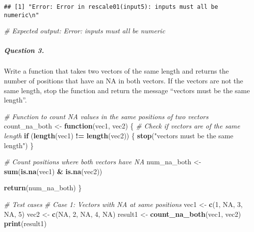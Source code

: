 \documentclass[
]{article}
\newenvironment{Shaded}{\begin{snugshade}}{\end{snugshade}}
\newcommand{\CommentTok}[1]{\textcolor[rgb]{0.56,0.35,0.01}{\textit{#1}}}
\newcommand{\ConstantTok}[1]{\textcolor[rgb]{0.56,0.35,0.01}{#1}}
\newcommand{\ControlFlowTok}[1]{\textcolor[rgb]{0.13,0.29,0.53}{\textbf{#1}}}
\newcommand{\DecValTok}[1]{\textcolor[rgb]{0.00,0.00,0.81}{#1}}
\newcommand{\FunctionTok}[1]{\textcolor[rgb]{0.13,0.29,0.53}{\textbf{#1}}}
\newcommand{\NormalTok}[1]{#1}
\newcommand{\OtherTok}[1]{\textcolor[rgb]{0.56,0.35,0.01}{#1}}
\newcommand{\SpecialCharTok}[1]{\textcolor[rgb]{0.81,0.36,0.00}{\textbf{#1}}}
\newcommand{\StringTok}[1]{\textcolor[rgb]{0.31,0.60,0.02}{#1}}
\begin{document}
\begin{verbatim}
## [1] "Error: Error in rescale01(input5): inputs must all be numeric\n"
\end{verbatim}

\begin{Shaded}
\begin{Highlighting}[]
\CommentTok{\# Expected output: Error: inputs must all be numeric}
\end{Highlighting}
\end{Shaded}

\hypertarget{question-3.}{%
\subparagraph{Question 3.}\label{question-3.}}

Write a function that takes two vectors of the same length and returns
the number of positions that have an NA in both vectors. If the vectors
are not the same length, stop the function and return the message
``vectors must be the same length''.

\begin{Shaded}
\begin{Highlighting}[]
\CommentTok{\# Function to count NA values in the same positions of two vectors}
\NormalTok{count\_na\_both }\OtherTok{\textless{}{-}} \ControlFlowTok{function}\NormalTok{(vec1, vec2) \{}
  \CommentTok{\# Check if vectors are of the same length}
  \ControlFlowTok{if}\NormalTok{ (}\FunctionTok{length}\NormalTok{(vec1) }\SpecialCharTok{!=} \FunctionTok{length}\NormalTok{(vec2)) \{}
    \FunctionTok{stop}\NormalTok{(}\StringTok{"vectors must be the same length"}\NormalTok{)}
\NormalTok{  \}}
  
  \CommentTok{\# Count positions where both vectors have NA}
\NormalTok{  num\_na\_both }\OtherTok{\textless{}{-}} \FunctionTok{sum}\NormalTok{(}\FunctionTok{is.na}\NormalTok{(vec1) }\SpecialCharTok{\&} \FunctionTok{is.na}\NormalTok{(vec2))}
  
  \FunctionTok{return}\NormalTok{(num\_na\_both)}
\NormalTok{\}}

\CommentTok{\# Test cases}
\CommentTok{\# Case 1: Vectors with NA at same positions}
\NormalTok{vec1 }\OtherTok{\textless{}{-}} \FunctionTok{c}\NormalTok{(}\DecValTok{1}\NormalTok{, }\ConstantTok{NA}\NormalTok{, }\DecValTok{3}\NormalTok{, }\ConstantTok{NA}\NormalTok{, }\DecValTok{5}\NormalTok{)}
\NormalTok{vec2 }\OtherTok{\textless{}{-}} \FunctionTok{c}\NormalTok{(}\ConstantTok{NA}\NormalTok{, }\DecValTok{2}\NormalTok{, }\ConstantTok{NA}\NormalTok{, }\DecValTok{4}\NormalTok{, }\ConstantTok{NA}\NormalTok{)}
\NormalTok{result1 }\OtherTok{\textless{}{-}} \FunctionTok{count\_na\_both}\NormalTok{(vec1, vec2)}
\FunctionTok{print}\NormalTok{(result1)}
\end{Highlighting}
\end{Shaded}
\end{document}
